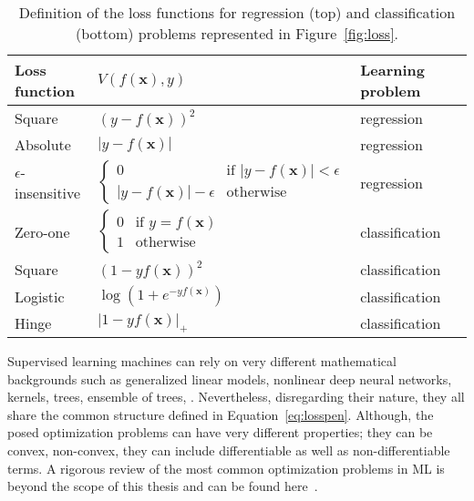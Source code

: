     \begin{table}[!ht]
      \centering
      \caption{Definition of the loss functions for regression (top) and classification (bottom) problems represented in Figure~\ref{fig:loss}.}\label{tab:losses}
      \begin{tabular}{@{}ll@{}ll@{}}
        \toprule
        Loss function & $V(f(\bm{x}),y)$  & Learning problem           \\ \midrule
        Square                   & $(y - f(\bm{x}))^2$ & regression \\
        Absolute                 & $|y - f(\bm{x})|$ & regression   \\
        $\epsilon$-insensitive   & $\begin{cases}
            0 & \text{if } |y-f(\bm{x})| < \epsilon\\
            |y-f(\bm{x})| - \epsilon & \text{otherwise}
        \end{cases} $        & regression                 \\
        \midrule
        Zero-one               & $\begin{cases}
            0 & \text{if } y = f(\bm{x})\\
            1 & \text{otherwise}
            \end{cases}$ & classification \\
        Square                 & $(1 - yf(\bm{x}))^2$ & classification  \\
        Logistic                 & $\log(1 + e^{-yf(\bm{x})})$ & classification  \\
        Hinge                 & $|1 - yf(\bm{x})|_+$ & classification  \\
        \bottomrule
      \end{tabular}
    \end{table}

    Supervised learning machines can rely on very different mathematical backgrounds such as generalized linear models, nonlinear deep neural networks, kernels, trees, ensemble of trees, \etc. Nevertheless, disregarding their nature, they all share the common structure defined in Equation~\eqref{eq:losspen}. Although, the posed optimization problems can have very different properties; they can be convex, non-convex, they can include differentiable as well as non-differentiable terms. A rigorous review of the most common optimization problems in ML is beyond the scope of this thesis and can be found here~\cite{boyd2004convex, bach2012optimization, sra2012optimization, nesterov2013introductory}.

